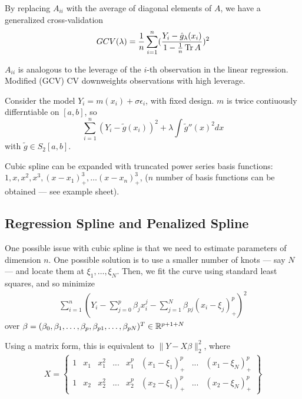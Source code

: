 By replacing $A_{ii}$ with the average of diagonal elements of $A$, we
have a generalized cross-validation
\begin{equation}
  \label{eq:81}
  GCV(\lambda) = \frac{1}{n} \sum_{i=1}^{n} (\frac{Y_{i} - \hat
    g_{\lambda}(x_{i})}{1 - \frac{1}{n} \operatorname*{Tr}{A}} )^{2}
\end{equation}

$A_{ii}$ is analogous to the leverage of the $i$-th observation in the
linear regression.  Modified (GCV) CV downweights observations with
high leverage.

Consider the model $Y_{i} = m(x_{i}) + \sigma \epsilon_{i}$, with
fixed design.  $m$ is twice contiuously differntiable on $[a, b]$, so
\begin{equation}
  \label{eq:82}
  \sum_{i=1}^{n} (Y_{i} - \tilde g(x_{i}))^{2} + \lambda \int \tilde
  g''(x)^{2} dx
\end{equation} with $\tilde g \in S_{2}[a, b]$.

Cubic spline can be expanded with truncated power series basis
functions: $1, x, x^{2}, x^{3}, (x - x_{1})^{3}_{+}, \dots (x -
x_{n})^{3}_{+}$, ($n$ number of basis functions can be obtained ---
see example sheet).

\subsection{Regression Spline and Penalized Spline}
\label{sec:regr-spline-penal}

One possible issue with cubic spline is that we need to estimate
parameters of dimension $n$.  One possible solution is to use a
smaller number of knots --- say $N$ --- and locate them at $\xi_{1},
\dots, \xi_{N}$. Then, we fit the curve using standard least squares,
and so minimize
\begin{align}
  \label{eq:83}
  \sum_{i=1}^{n} (Y_{i} - \sum_{j=0}^{p} \beta_{j} x_{i}^{j} -
  \sum_{j=1}^{N} \beta_{pj} (x_{i} - \xi_{j})_{+}^{p})^{2}
\end{align} over $\beta = (\beta_{0}, \beta_{1}, \dots, \beta_{p},
\beta_{p1}, \dots, \beta_{pN})^{T} \in \mathbb{R}^{p + 1 + N}$

Using a matrix form, this is equivalent to $\| Y - X \beta
\|_{2}^{2}$, where
\begin{align}
  \label{eq:84}
  X =
  \begin{Bmatrix}
    1 & x_{1} & x_{1}^{2} & ... & x_{1}^{p} & (x_{1} -
    \xi_{1})_{+}^{p} & ... & (x_{1} - \xi_{N})_{+}^{p} \\
    1 & x_{2} & x_{2}^{2} & ... & x_{2}^{p} & (x_{2} -
    \xi_{1})_{+}^{p} & ... & (x_{2} - \xi_{N})_{+}^{p} 
  \end{Bmatrix}
\end{align}


